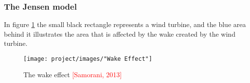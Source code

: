 \documentclass{article}
\begin{document}
\subsubsection{The Jensen model}


In figure \ref{Wake effect} the small black rectangle represents a wind turbine, and the blue area behind it illustrates the area that is affected by the wake created by the wind turbine.


\begin{figure}[h!]
\begin{center}
\texttt{[image: project/images/"Wake Effect"]}
\caption{The wake effect \textcolor{red}{[Samorani, 2013]}}
\label{Wake effect}
\end{center}
\end{figure}
\end{document}
